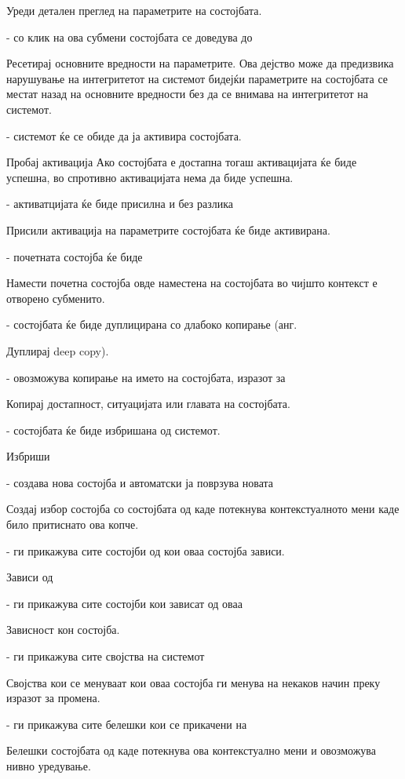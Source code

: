 Уреди детален преглед на параметрите на состојбата.

- со клик на ова субмени состојбата се доведува до

Ресетирај основните вредности на параметрите. Ова дејство може да предизвика нарушување на интегритетот на системот бидејќи параметрите на состојбата се местат назад на основните вредности без да се внимава на интегритетот на системот.

- системот ќе се обиде да ја активира состојбата.

Пробај активација Ако состојбата е достапна тогаш активацијата ќе биде успешна, во спротивно активацијата нема да биде успешна.

- активатцијата ќе биде присилна и без разлика

Присили активација на параметрите состојбата ќе биде активирана.

- почетната состојба ќе биде

Намести почетна состојба овде наместена на состојбата во чијшто контекст е отворено субменито.

- состојбата ќе биде дуплицирана со длабоко копирање (анг.

Дуплирај deep copy).

- овозможува копирање на името на состојбата, изразот за

Копирај достапност, ситуацијата или главата на состојбата.

- состојбата ќе биде избришана од системот.

Избриши

- создава нова состојба и автоматски ја поврзува новата

Создај избор состојба со состојбата од каде потекнува контекстуалното мени каде било притиснато ова копче.

- ги прикажува сите состојби од кои оваа состојба зависи.

Зависи од

- ги прикажува сите состојби кои зависат од оваа

Зависност кон состојба.

- ги прикажува сите својства на системот

Својства кои се менуваат кои оваа состојба ги менува на некаков начин преку изразот за промена.

- ги прикажува сите белешки кои се прикачени на

Белешки состојбата од каде потекнува ова контекстуално мени и овозможува нивно уредување.

